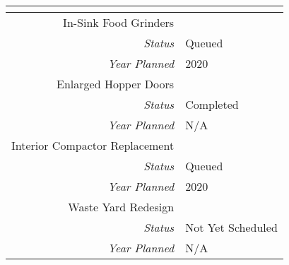 
        \begin{tabularx}{\textwidth}{r|X|}
        \cline{2-1}
        \multicolumn{1}{l|}{}                                                        & \cellcolor{ccorange}{\color[HTML]{FFFFFF}Lafayette} \\ \hline
\multicolumn{1}{|V{.2\columnwidth}|}{\cellcolor{ccorangelight}In-Sink Food Grinders}          &                                                                  \\
        \multicolumn{1}{|r|}{\cellcolor{ccorangelight}\textit{Status}}                & Queued                                                         \\
        \multicolumn{1}{|r|}{\cellcolor{ccorangelight}\textit{Year Planned}}                  & 2020                                                     \\ \hline
\multicolumn{1}{|V{.2\columnwidth}|}{\cellcolor{ccorangelight}Enlarged Hopper Doors}          &                                                                  \\
        \multicolumn{1}{|r|}{\cellcolor{ccorangelight}\textit{Status}}                & Completed                                                         \\
        \multicolumn{1}{|r|}{\cellcolor{ccorangelight}\textit{Year Planned}}                  & N/A                                                     \\ \hline
\multicolumn{1}{|V{.2\columnwidth}|}{\cellcolor{ccorangelight}Interior Compactor Replacement}          &                                                                  \\
        \multicolumn{1}{|r|}{\cellcolor{ccorangelight}\textit{Status}}                & Queued                                                         \\
        \multicolumn{1}{|r|}{\cellcolor{ccorangelight}\textit{Year Planned}}                  & 2020                                                     \\ \hline
\multicolumn{1}{|V{.2\columnwidth}|}{\cellcolor{ccorangelight}Waste Yard Redesign}          &                                                                  \\
        \multicolumn{1}{|r|}{\cellcolor{ccorangelight}\textit{Status}}                & Not Yet Scheduled                                                         \\
        \multicolumn{1}{|r|}{\cellcolor{ccorangelight}\textit{Year Planned}}                  & N/A                                                     \\ \hline
\end{tabularx}